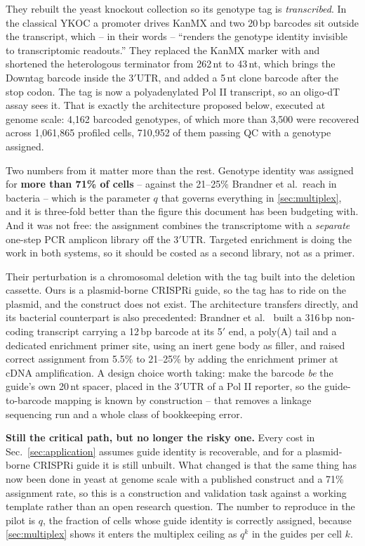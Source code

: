They rebuilt the yeast knockout collection so its genotype tag is
\emph{transcribed}. In the classical YKOC a  promoter drives KanMX and
two 20\,bp barcodes sit outside the transcript, which -- in their words -- ``renders the genotype identity invisible to transcriptomic readouts.'' They
replaced the KanMX marker with  and shortened the heterologous
terminator from 262\,nt to 43\,nt, which brings the Downtag barcode inside the
 3$'$UTR, and added a 5\,nt clone barcode after the stop codon. The
tag is now a polyadenylated Pol II transcript, so an oligo-dT assay sees it. That
is exactly the architecture proposed below, executed at genome scale: 4{,}162
barcoded genotypes, of which more than 3{,}500 were recovered across 1{,}061{,}865
profiled cells, 710{,}952 of them passing QC with a genotype assigned.

Two numbers from it matter more than the rest. Genotype identity was assigned for
\textbf{more than 71\% of cells} -- against the 21--25\% Brandner et al.\ reach
in bacteria -- which is the parameter $q$ that governs everything in
\cref{sec:multiplex}, and it is three-fold better than the figure this document
has been budgeting with. And it was not free: the assignment combines the
transcriptome with a \emph{separate} one-step PCR amplicon library off the
 3$'$UTR. Targeted enrichment is doing the work in both systems, so it
should be costed as a second library, not as a primer.

 Their perturbation is a chromosomal deletion
with the tag built into the deletion cassette. Ours is a plasmid-borne CRISPRi
guide, so the tag has to ride on the plasmid, and the construct does not exist.
The architecture transfers directly, and its bacterial counterpart is also
precedented: Brandner et
al.\ \citep{brandnerPooledSinglecellCRISPRa2025} built a 316\,bp non-coding
transcript carrying a 12\,bp barcode at its 5$'$ end, a poly(A) tail and a
dedicated enrichment primer site, using an inert gene body as filler, and raised
correct assignment from 5.5\% to 21--25\% by adding the enrichment primer at cDNA
amplification. A design choice worth taking: make the barcode \emph{be} the
guide's own 20\,nt spacer, placed in the 3$'$UTR of a Pol II reporter, so the
guide-to-barcode mapping is known by construction -- that removes a linkage
sequencing run and a whole class of bookkeeping error.

\begin{keybox}
\textbf{Still the critical path, but no longer the risky one.} Every cost in
Sec.~\ref{sec:application} assumes guide identity is recoverable, and for a
plasmid-borne CRISPRi guide it is still unbuilt. What changed is that the same
thing has now been done in yeast at genome scale with a published construct and a
71\% assignment rate, so this is a construction and validation task against a
working template rather than an open research question. The number to reproduce
in the pilot is $q$, the fraction of cells whose guide identity is correctly
assigned, because \cref{sec:multiplex} shows it enters the multiplex ceiling as
$q^{k}$ in the guides per cell $k$.
\end{keybox}
